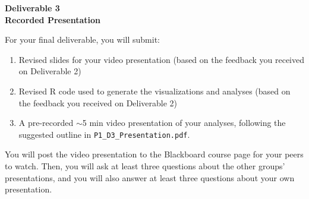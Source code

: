 \documentclass[12pt]{article}
\begin{document}
\begin{center}
\textbf{\Large Deliverable 3 \\ Recorded Presentation}
\end{center}

For your final deliverable, you will submit:
\begin{enumerate}
    \item Revised slides for your video presentation (based on the feedback you received on Deliverable 2)
    \item Revised R code used to generate the visualizations and analyses (based on the feedback you received on Deliverable 2)
    \item A pre-recorded $\sim$5 min video presentation of your analyses, following the suggested outline in \texttt{P1\_D3\_Presentation.pdf}.
\end{enumerate}

You will post the video presentation to the Blackboard course page for your peers to watch. 
Then, you will ask at least three questions about the other groups' presentations, and you 
will also answer at least three questions about your own presentation.
\end{document}
